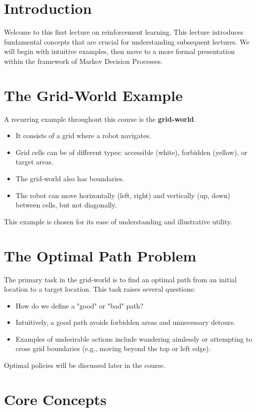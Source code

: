 \documentclass{article}
\begin{document}
\section*{Introduction} %
Welcome to this first lecture on reinforcement learning. This lecture introduces fundamental concepts that are crucial for understanding subsequent lectures. We will begin with intuitive examples, then move to a more formal presentation within the framework of Markov Decision Processes.

\section*{The Grid-World Example}
A recurring example throughout this course is the \textbf{grid-world}.
\begin{itemize}[noitemsep]
    \item It consists of a grid where a robot navigates.
    \item Grid cells can be of different types: accessible (white), forbidden (yellow), or target areas.
    \item The grid-world also has boundaries.
    \item The robot can move horizontally (left, right) and vertically (up, down) between cells, but not diagonally.
\end{itemize}
This example is chosen for its ease of understanding and illustrative utility.

\section*{The Optimal Path Problem}
The primary task in the grid-world is to find an optimal path from an initial location to a target location. This task raises several questions:
\begin{itemize}[noitemsep]
    \item How do we define a "good" or "bad" path?
    \item Intuitively, a good path avoids forbidden areas and unnecessary detours.
    \item Examples of undesirable actions include wandering aimlessly or attempting to cross grid boundaries (e.g., moving beyond the top or left edge).
\end{itemize}
Optimal policies will be discussed later in the course.

\section*{Core Concepts}
\end{document}

